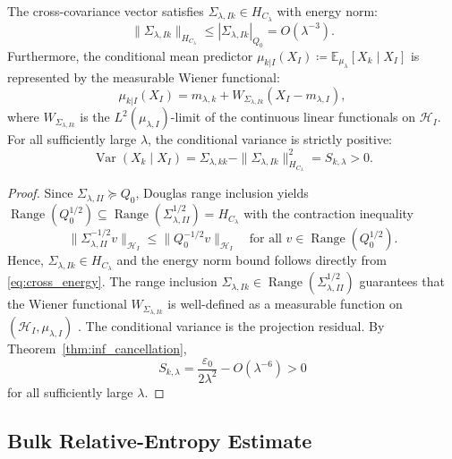 \begin{lemma}
\label{lem:conditional_predictor}
The cross-covariance vector satisfies $\Sigma_{\lambda,Ik} \in H_{C_\lambda}$ with energy norm:
\begin{equation}
  \|\Sigma_{\lambda,Ik}\|_{H_{C_\lambda}} \le |\Sigma_{\lambda,Ik}|_{Q_0} = O(\lambda^{-3}).
\end{equation}
Furthermore, the conditional mean predictor $\mu_{k|I}(X_I) \coloneqq \mathbb{E}_{\mu_\lambda}[X_k \mid X_I]$ is represented by the measurable Wiener functional:
\begin{equation}
  \mu_{k|I}(X_I) = m_{\lambda,k} + W_{\Sigma_{\lambda,Ik}}(X_I - m_{\lambda,I}),
\end{equation}
where $W_{\Sigma_{\lambda,Ik}}$ is the $L^2(\mu_{\lambda,I})$-limit of the continuous linear functionals on $\mathcal{H}_I$. For all sufficiently large $\lambda$, the conditional variance is strictly positive:
\begin{equation}
  \operatorname{Var}(X_k \mid X_I) = \Sigma_{\lambda,kk} - \|\Sigma_{\lambda,Ik}\|_{H_{C_\lambda}}^2 = S_{k,\lambda} > 0.
\end{equation}
\end{lemma}
\begin{proof}
Since $\Sigma_{\lambda,II} \succeq Q_0$, Douglas range inclusion \cite{douglas1966majorization} yields $\operatorname{Range}(Q_0^{1/2}) \subseteq \operatorname{Range}(\Sigma_{\lambda,II}^{1/2}) = H_{C_\lambda}$ with the contraction inequality
\[
  \|\Sigma_{\lambda,II}^{-1/2} v\|_{\mathcal{H}_I} \le \|Q_0^{-1/2} v\|_{\mathcal{H}_I} \quad \text{for all } v \in \operatorname{Range}(Q_0^{1/2}).
\]
Hence, $\Sigma_{\lambda,Ik} \in H_{C_\lambda}$ and the energy norm bound follows directly from \eqref{eq:cross_energy}.
The range inclusion $\Sigma_{\lambda,Ik} \in \operatorname{Range}(\Sigma_{\lambda,II}^{1/2})$ guarantees that the Wiener functional $W_{\Sigma_{\lambda,Ik}}$ is well-defined as a measurable function on $(\mathcal{H}_I, \mu_{\lambda,I})$ \cite{bogachev1998gaussian}. The conditional variance is the projection residual. By Theorem~\ref{thm:inf_cancellation},
\[
  S_{k,\lambda}
  = \frac{\varepsilon_0}{2\lambda^2}-O(\lambda^{-6})>0
\]
for all sufficiently large $\lambda$.
\end{proof}

\subsection{Bulk Relative-Entropy Estimate}

